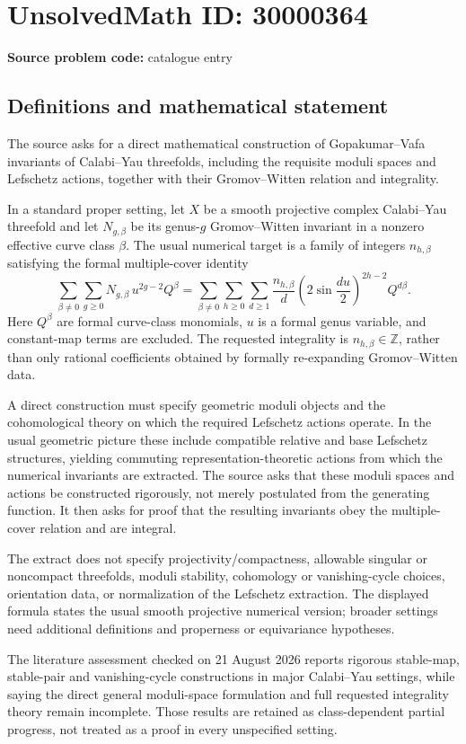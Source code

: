 \documentclass[11pt]{article}
\newcommand{\Z}{\mathbb{Z}}
\begin{document}
\section*{UnsolvedMath ID: 30000364}
\textbf{Source problem code:} catalogue entry
\subsection{Definitions and mathematical statement}
The source asks for a direct mathematical construction of Gopakumar--Vafa invariants of Calabi--Yau threefolds, including the requisite moduli spaces and Lefschetz actions, together with their Gromov--Witten relation and integrality.

In a standard proper setting, let $X$ be a smooth projective complex Calabi--Yau threefold and let $N_{g,\beta}$ be its genus-$g$ Gromov--Witten invariant in a nonzero effective curve class $\beta$. The usual numerical target is a family of integers $n_{h,\beta}$ satisfying the formal multiple-cover identity
\[
 \sum_{\beta\ne0}\sum_{g\ge0}N_{g,\beta}\,u^{2g-2}Q^\beta
 =\sum_{\beta\ne0}\sum_{h\ge0}\sum_{d\ge1}
 \frac{n_{h,\beta}}{d}
 \left(2\sin\frac{du}{2}\right)^{2h-2}Q^{d\beta}.
\]
Here $Q^\beta$ are formal curve-class monomials, $u$ is a formal genus variable, and constant-map terms are excluded. The requested integrality is $n_{h,\beta}\in\Z$, rather than only rational coefficients obtained by formally re-expanding Gromov--Witten data.

A direct construction must specify geometric moduli objects and the cohomological theory on which the required Lefschetz actions operate. In the usual geometric picture these include compatible relative and base Lefschetz structures, yielding commuting representation-theoretic actions from which the numerical invariants are extracted. The source asks that these moduli spaces and actions be constructed rigorously, not merely postulated from the generating function. It then asks for proof that the resulting invariants obey the multiple-cover relation and are integral.

The extract does not specify projectivity/compactness, allowable singular or noncompact threefolds, moduli stability, cohomology or vanishing-cycle choices, orientation data, or normalization of the Lefschetz extraction. The displayed formula states the usual smooth projective numerical version; broader settings need additional definitions and properness or equivariance hypotheses.

The literature assessment checked on 21 August 2026 reports rigorous stable-map, stable-pair and vanishing-cycle constructions in major Calabi--Yau settings, while saying the direct general moduli-space formulation and full requested integrality theory remain incomplete. Those results are retained as class-dependent partial progress, not treated as a proof in every unspecified setting.
\end{document}
